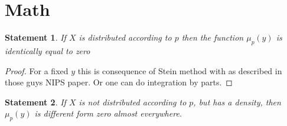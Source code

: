 \documentclass{article}
\newtheorem{statement}{Statement}
\begin{document}
\section{Math}

\begin{statement}
 If $X$ is distributed according to $p$ then the function  $\mu_p(y)$ is identically equal to zero  
\end{statement}
\begin{proof}
 For a fixed $y$ this is consequence of Stein method with as described in those guys NIPS paper. Or one can do integration by parts.   
\end{proof}

\begin{statement}
 If $X$ is not distributed according to $p$, but has a density, then $\mu_p(y)$ is different form zero almost everywhere. 
\end{statement}
\end{document}
